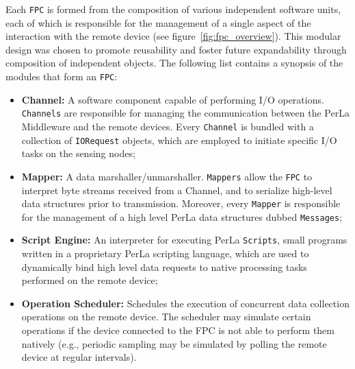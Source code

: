 Each \texttt{FPC} is formed from the composition of various independent
software units, each of which is responsible for the management of a single
aspect of the interaction with the remote device (see
figure~\ref{fig:fpc_overview}). This modular design was chosen to promote
reusability and foster future expandability through composition of
independent objects. The following list contains a synopsis of the modules
that form an \texttt{FPC}:

\begin{itemize}

    \item \textbf{Channel:} A software component capable of performing I/O
        operations. \texttt{Channels} are responsible for managing the
        communication between the PerLa Middleware and the remote devices.
        Every \texttt{Channel} is bundled with a collection of
        \texttt{IORequest} objects, which are employed to initiate specific I/O
        tasks on the sensing nodes;

    \item \textbf{Mapper:} A data marshaller/unmarshaller. \texttt{Mappers}
        allow the \texttt{FPC} to interpret byte streams received from a
        Channel, and to serialize high-level data structures prior to
        transmission. Moreover, every \texttt{Mapper} is responsible for the
        management of a high level PerLa data structures dubbed
        \texttt{Messages};

    \item \textbf{Script Engine:} An interpreter for executing PerLa
        \texttt{Scripts}, small programs written in a proprietary PerLa
        scripting language, which are used to dynamically bind high level data
        requests to native processing tasks performed on the remote device;

    \item \textbf{Operation Scheduler:} Schedules the execution of concurrent
        data collection operations on the remote device. The scheduler may
        simulate certain operations if the device connected to the FPC is not
        able to perform them natively (e.g., periodic sampling may be simulated
        by polling the remote device at regular intervals).

\end{itemize}

